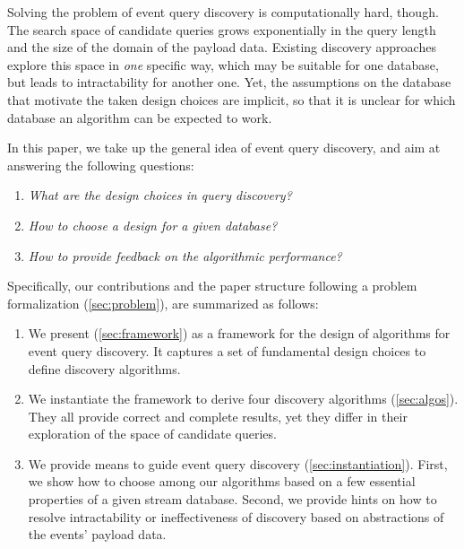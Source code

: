 Solving the problem of event query discovery is computationally hard, though.
The search space of candidate queries grows exponentially in
the query length and the size of the domain of the payload data. Existing
discovery approaches~\cite{icep,ilminer} explore this
space in \emph{one} specific way, which may be suitable for one
database, but leads to intractability for another one. Yet, the assumptions on
the database that motivate the taken design choices are implicit, so that it is
unclear for which database an algorithm can be expected to work.


In this paper, we take up the general idea of event query discovery, and aim at
answering the following questions:
\begin{enumerate}[label=(\roman*),left=0pt,nosep]
\item \emph{What are the design choices in query discovery?}
\item \emph{How to choose a design for a given database?}
\item \emph{How to provide feedback on the algorithmic performance?}
\end{enumerate}
 Specifically, our contributions and the
paper structure following a problem formalization
(\autoref{sec:problem}), are summarized as follows:
\begin{enumerate}[left=0pt,nosep]
\item We present \sys{} (\autoref{sec:framework})
as a framework
for the design of algorithms for event query
discovery. It captures a set of fundamental design
choices to define discovery algorithms.
\item We instantiate the framework to derive four
discovery algorithms
(\autoref{sec:algos}). They all provide correct
and complete results, yet they differ in their exploration of the space of
candidate queries.
\item We provide means to guide event query discovery
(\autoref{sec:instantiation}). First, we show how to choose among our
algorithms based on a few essential properties of a given stream database.
Second, we provide hints on how to resolve intractability or ineffectiveness of
discovery based on abstractions of the events' payload data.
\end{enumerate}
